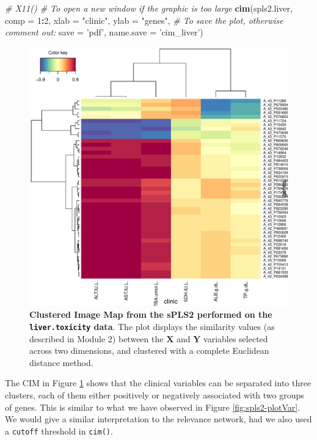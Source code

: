 \documentclass[]{book}
\newenvironment{Shaded}{\begin{snugshade}}{\end{snugshade}}
\newcommand{\KeywordTok}[1]{\textcolor[rgb]{0.13,0.29,0.53}{\textbf{#1}}}
\newcommand{\DataTypeTok}[1]{\textcolor[rgb]{0.13,0.29,0.53}{#1}}
\newcommand{\DecValTok}[1]{\textcolor[rgb]{0.00,0.00,0.81}{#1}}
\newcommand{\StringTok}[1]{\textcolor[rgb]{0.31,0.60,0.02}{#1}}
\newcommand{\CommentTok}[1]{\textcolor[rgb]{0.56,0.35,0.01}{\textit{#1}}}
\newcommand{\OperatorTok}[1]{\textcolor[rgb]{0.81,0.36,0.00}{\textbf{#1}}}
\newcommand{\NormalTok}[1]{#1}
\begin{document}
\begin{Shaded}
\begin{Highlighting}[]
\CommentTok{# X11()  # To open a new window if the graphic is too large}
\KeywordTok{cim}\NormalTok{(spls2.liver, }\DataTypeTok{comp =} \DecValTok{1}\OperatorTok{:}\DecValTok{2}\NormalTok{, }\DataTypeTok{xlab =} \StringTok{"clinic"}\NormalTok{, }\DataTypeTok{ylab =} \StringTok{"genes"}\NormalTok{,}
    \CommentTok{# To save the plot, otherwise comment out:}
    \DataTypeTok{save =} \StringTok{'pdf'}\NormalTok{, }\DataTypeTok{name.save =} \StringTok{'cim_liver'}\NormalTok{)}
\end{Highlighting}
\end{Shaded}

\begin{figure}

{\centering \includegraphics[width=0.5\linewidth]{cim_liver} 

}

\caption{\textbf{Clustered Image Map from the sPLS2 performed on
the \texttt{liver.toxicity} data}. The plot displays the similarity
values (as described in Module 2) between the \(\boldsymbol X\) and
\(\boldsymbol Y\) variables selected across two dimensions, and
clustered with a complete Euclidean distance method.}\label{fig:spls2-cim}
\end{figure}







The CIM in Figure \ref{fig:spls2-cim} shows that the clinical variables
can be separated into three clusters, each of them either positively or
negatively associated with two groups of genes. This is similar to what
we have observed in Figure \ref{fig:spls2-plotVar}. We would give a
similar interpretation to the relevance network, had we also used a
\texttt{cutoff} threshold in \texttt{cim()}.
\end{document}
